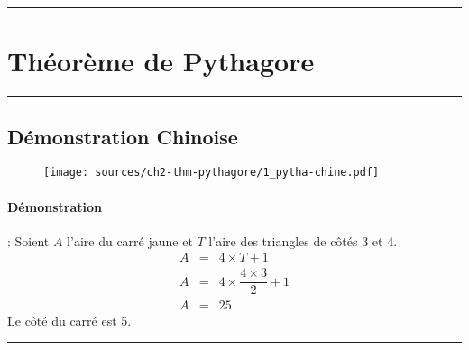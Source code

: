 \documentclass[11pt]{article}
\newcommand{\horrule}[1]{\rule{\linewidth}{#1}} %
\begin{document}

\newtheorem{Definition}{Définition}
\newtheorem{Theorem}{Théorème}
\newtheorem{Proposition}{Propriété}

\renewcommand{\labelitemi}{$\bullet$}
\renewcommand{\labelitemii}{$\circ$}

\setlength{\columnseprule}{1pt}

\horrule{2px}
\section{Théorème de Pythagore}
\horrule{2px}


  \subsection{Démonstration Chinoise}

\begin{multicols}{2}

  \begin{figure}[H]
    \centering
    \texttt{[image: sources/ch2-thm-pythagore/1\_pytha-chine.pdf]}
  \end{figure}


  \paragraph{Démonstration} : Soient $A$ l'aire du carré jaune et $T$ l'aire des triangles de côtés 3 et 4. 
  \begin{eqnarray*}
    A &=&  4 \times T + 1\\
    A &=&  4 \times \dfrac{4 \times 3}{2} + 1\\
    A &=& 25
  \end{eqnarray*}
  Le côté du carré est 5.

\end{multicols}

\horrule{1px}
\end{document}
